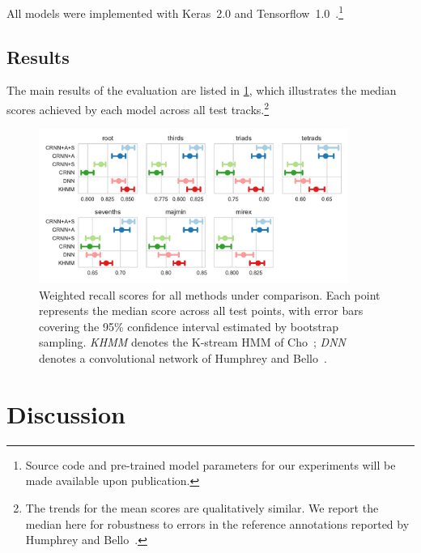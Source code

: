 \documentclass{article}
\begin{document}
All models were implemented with Keras~2.0 and Tensorflow~1.0~\cite{chollet2015keras, tensorflow2015-whitepaper}.\footnote{Source code and pre-trained model parameters for our experiments will be made available upon publication.}

\subsection{Results}

The main results of the evaluation are listed in \cref{fig:results}, which illustrates the median scores achieved by each model across all test tracks.\footnote{The trends for the mean scores are qualitatively similar. We report the median here for robustness to errors in the reference annotations reported by Humphrey and Bello~\cite{humphrey2015four}.}
\begin{figure}[t]
    \centering
    \includegraphics[width=0.9\textwidth]{crnn-scores}
    \caption{Weighted recall scores for all methods under comparison.  Each point represents the median score across all test points, with error bars covering the 95\% confidence interval estimated by bootstrap sampling.
        \emph{KHMM} denotes the K-stream HMM of Cho~\cite{cho2014improved}; \emph{DNN} denotes a convolutional network of Humphrey and Bello~\cite{humphrey2015four}.\label{fig:results}}
\end{figure}
\section{Discussion}




\end{document}
